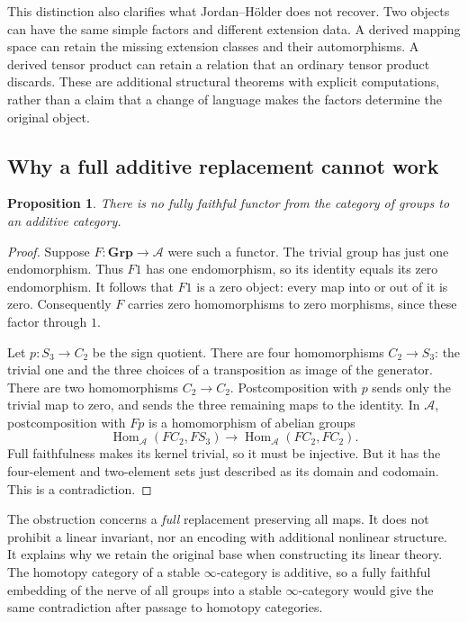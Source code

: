 \documentclass[11pt]{article}
\newtheorem{proposition}[theorem]{Proposition}
\theoremstyle{definition}
\theoremstyle{remark}\newtheorem{remark}[theorem]{Remark}
\begin{document}
This distinction also clarifies what Jordan--H\"older does not recover.
Two objects can have the same simple factors and different extension
data.  A derived mapping space can retain the missing extension classes
and their automorphisms.  A derived tensor product can retain a relation
that an ordinary tensor product discards.  These are additional structural
theorems with explicit computations, rather than a claim that a change of
language makes the factors determine the original object.

\subsection{Why a full additive replacement cannot work}

\begin{proposition}\label{t:no-full-additive}
There is no fully faithful functor from the category of groups to an
additive category.
\end{proposition}
\begin{proof}
Suppose $F:\mathbf{Grp}\to\mathcal A$ were such a functor.  The trivial
group has just one endomorphism.  Thus $F1$ has one endomorphism, so its
identity equals its zero endomorphism.  It follows that $F1$ is a zero
object: every map into or out of it is zero.  Consequently $F$ carries
zero homomorphisms to zero morphisms, since these factor through $1$.

Let $p:S_3\to C_2$ be the sign quotient.  There are four homomorphisms
$C_2\to S_3$: the trivial one and the three choices of a transposition
as image of the generator.  There are two homomorphisms $C_2\to C_2$.
Postcomposition with $p$ sends only the trivial map to zero, and sends
the three remaining maps to the identity.  In $\mathcal A$, postcomposition
with $Fp$ is a homomorphism of abelian groups
\[
 \operatorname{Hom}_{\mathcal A}(FC_2,FS_3)
 \longrightarrow \operatorname{Hom}_{\mathcal A}(FC_2,FC_2).
\]
Full faithfulness makes its kernel trivial, so it must be injective.  But
it has the four-element and two-element sets just described as its domain
and codomain.  This is a contradiction.
\end{proof}

The obstruction concerns a \emph{full} replacement preserving all maps.
It does not prohibit a linear invariant, nor an encoding with additional
nonlinear structure.  It explains why we retain the original base when
constructing its linear theory.  The homotopy category of a stable
$\infty$-category is additive, so a fully faithful embedding of the nerve
of all groups into a stable $\infty$-category would give the same
contradiction after passage to homotopy categories.
\end{document}
